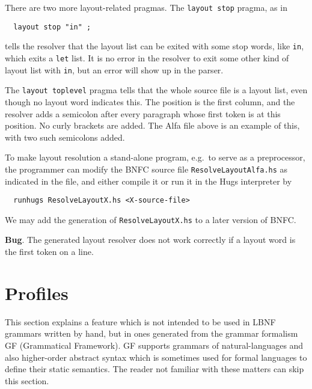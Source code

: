 \documentclass[10pt]{article}
\begin{document}
There are two more layout-related pragmas. The {\tt layout stop}
pragma, as in
\begin{verbatim}
  layout stop "in" ;
\end{verbatim}
tells the resolver that the layout list can be exited with
some stop words, like {\tt in}, which exits a
{\tt let} list. It is no error in the resolver to exit
some other kind of layout list with {\tt in}, but an error will show up
in the parser.

The {\tt layout toplevel} pragma tells that the whole source file
is a layout list, even though no layout word indicates this.
The position is the first column, and the resolver adds a semicolon
after every paragraph whose first token is at this position. No curly
brackets are added. The Alfa file above is an example of this, with
two such semicolons added.

To make layout resolution a stand-alone program, e.g.\ to serve as a
preprocessor, the programmer can modify the BNFC source file
{\tt ResolveLayoutAlfa.hs} as indicated in the file,
and either compile it or run it in the Hugs interpreter by
\begin{verbatim}
  runhugs ResolveLayoutX.hs <X-source-file>
\end{verbatim}
We may add the generation of {\tt ResolveLayoutX.hs}
to a later version of BNFC.

{\bf Bug}. The generated layout resolver does not work correctly
if a layout word is the first token on a line.


\section{Profiles}
\label{profile}

This section explains a feature which is not intended to be used
in LBNF grammars written by hand, but in ones generated from
the grammar formalism GF (Grammatical Framework).
GF supports grammars of natural-languages
and also higher-order abstract syntax which is sometimes used for
formal languages to define their static semantics.
The reader not familiar with these matters can skip this section.
\end{document}
